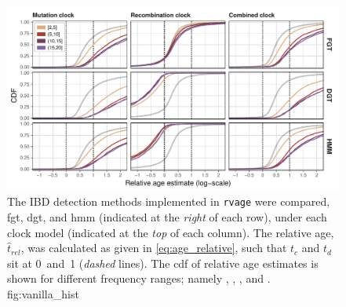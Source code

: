 

\begin{figure}[!htb]
\includegraphics[width=\textwidth]{./img/ch5/vanilla_hist}
{The  IBD detection methods implemented in \texttt{rvage} were compared, \ie \gls{fgt}, \gls{dgt}, and \gls{hmm} (indicated at the \emph{right} of each row), under each clock model (indicated at the \emph{top} of each column).
The relative age, ${\hat{t}_\textit{rel}}$, was calculated as given in \cref{eq:age_relative}, such that $t_c$ and $t_d$ sit at 0~and~1 (\emph{dashed} lines).
The \gls{cdf} of relative age estimates is shown for different frequency ranges; namely \fk{[2,5]}, \fk{(5,10]}, \fk{(10,15]}, and \fk{(15,20]}.
}
{fig:vanilla_hist}
\end{figure}
